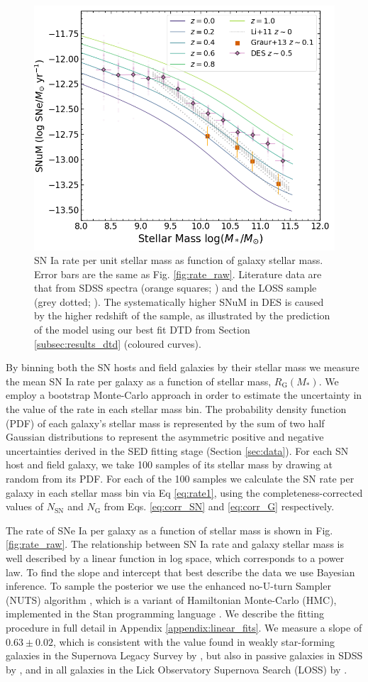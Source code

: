 \documentclass[fleqn,usenatbib]{mnras}
\begin{document}
\begin{figure}
    \centering
    \includegraphics[width=.5\textwidth]{figs/SNuM.png}
    \caption{SN Ia rate per unit stellar mass as function of galaxy stellar mass. Error bars are the same as Fig. \ref{fig:rate_raw}. Literature data are that from SDSS spectra (orange squares; \citealt{Graur2013}) and the LOSS sample (grey dotted; \citealt{Li2011a}). The systematically higher SNuM in DES is caused by the higher redshift of the sample, as illustrated by the  prediction of the model using our best fit DTD from Section \ref{subsec:results_dtd} (coloured curves). }%
    \label{fig:snum}
\end{figure}
By binning both the SN hosts and field galaxies by their stellar mass we measure the mean SN Ia rate per galaxy as a function of stellar mass, $R_{\mathrm{G}}(M_*)$. We employ a bootstrap Monte-Carlo approach in order to estimate the uncertainty in the value of the rate in each stellar mass bin. The probability density function (PDF) of each galaxy's stellar mass is represented by the sum of two half Gaussian distributions to represent the asymmetric positive and negative uncertainties derived in the SED fitting stage (Section \ref{sec:data}). For each SN host and field galaxy, we take 100 samples of its stellar mass by drawing at random from its PDF. For each of the 100 samples we calculate the SN rate per galaxy in each stellar mass bin via Eq \ref{eq:rate1}, using the completeness-corrected values of $N_{\mathrm{SN}}$ and $N_{\mathrm{G}}$ from Eqs. \ref{eq:corr_SN} and \ref{eq:corr_G} respectively. 

The rate of SNe Ia per galaxy as a function of stellar mass is shown in Fig. \ref{fig:rate_raw}. The relationship between SN Ia rate and galaxy stellar mass is well described by a linear function in log space, which corresponds to a power law. To find the slope and intercept that best describe the data we use Bayesian inference. To sample the posterior we use the enhanced no-U-turn Sampler (NUTS) algorithm \citep{Betancourt2017}, which is a variant of Hamiltonian Monte-Carlo (HMC), implemented in the Stan programming language \citep{Carpenter2017}. We describe the fitting procedure in full detail in Appendix \ref{appendix:linear_fits}. We measure a slope of $0.63\pm0.02$, which is consistent with the value found in weakly star-forming galaxies in the Supernova Legacy Survey by \citet{Sullivan2006}, but also in passive galaxies in SDSS by \citet{Smith2012}, and in all galaxies in the Lick Observatory Supernova Search (LOSS) by \citet{Li2011a}. 
\end{document}
